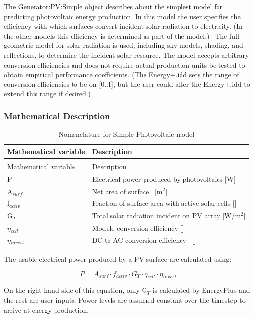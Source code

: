 The Generator:PV:Simple object describes about the simplest model for predicting photovoltaic energy production. In this model the user specifies the efficiency with which surfaces convert incident solar radiation to electricity. (In the other models this efficiency is determined as part of the model.)~ The full geometric model for solar radiation is used, including sky models, shading, and reflections, to determine the incident solar resource. The model accepts arbitrary conversion efficiencies and does not require actual production units be tested to obtain empirical performance coefficients. (The Energy+.idd sets the range of conversion efficiencies to be on {[}0..1{]}, but the user could alter the Energy+.idd to extend this range if desired.)

\subsubsection{Mathematical Description}\label{mathematical-description}

\begin{longtable}[l]{p{1.2in}p{4.8in}}
\caption{Nomenclature for Simple Photovoltaic model \label{table:nomenclature-for-simple-photovoltaic-model}} \tabularnewline
\toprule 
Mathematical variable & Description \tabularnewline
\midrule
\endfirsthead

\caption[]{Nomenclature for Simple Photovoltaic model} \tabularnewline
\toprule 
Mathematical variable & Description \tabularnewline
\midrule
\endhead

P & Electrical power produced by photovoltaics [W] \tabularnewline
A\(_{surf}\) & Net area of surface~ [m\(^{2}\)] \tabularnewline
f\(_{activ}\) & Fraction of surface area with active solar cells [] \tabularnewline
G\(_{T}\) & Total solar radiation incident on PV array [W/m\(^{2}\)] \tabularnewline
$\eta$\(_{cell}\) & Module conversion efficiency [] \tabularnewline
$\eta$\(_{invert}\) & DC to AC conversion efficiency~ [] \tabularnewline
\bottomrule
\end{longtable}

The usable electrical power produced by a PV surface are calculated using:

\begin{equation}
P = {A_{surf}} \cdot {f_{activ}} \cdot {G_T} \cdot {\eta_{cell}} \cdot {\eta_{invert}}
\end{equation}

On the right hand side of this equation, only G\(_{T}\) is calculated by EnergyPlus and the rest are user inputs. Power levels are assumed constant over the timestep to arrive at energy production.

